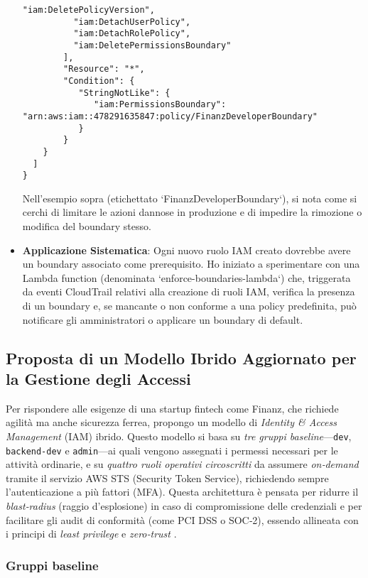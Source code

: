 \begin{itemize}
\begin{lstlisting}[style=json, caption={Esempio di Permission Boundary restrittiva per sviluppatori}, label=lst:permission-boundary-dev]
          "iam:DeletePolicyVersion",
          "iam:DetachUserPolicy",
          "iam:DetachRolePolicy",
          "iam:DeletePermissionsBoundary" 
        ],
        "Resource": "*",
        "Condition": {
           "StringNotLike": {
              "iam:PermissionsBoundary": "arn:aws:iam::478291635847:policy/FinanzDeveloperBoundary" 
           }
        }
    }
  ]
}
    \end{lstlisting}
    Nell'esempio sopra (etichettato `FinanzDeveloperBoundary`), si nota come si cerchi di limitare le azioni dannose in produzione e di impedire la rimozione o modifica del boundary stesso.
    \item \textbf{Applicazione Sistematica}: Ogni nuovo ruolo IAM creato dovrebbe avere un boundary associato come prerequisito. Ho iniziato a sperimentare con una Lambda function (denominata `enforce-boundaries-lambda`) che, triggerata da eventi CloudTrail relativi alla creazione di ruoli IAM, verifica la presenza di un boundary e, se mancante o non conforme a una policy predefinita, può notificare gli amministratori o applicare un boundary di default.
\end{itemize}

\subsection{Proposta di un Modello Ibrido Aggiornato per la Gestione degli Accessi}
\label{subsec:modello_ibrido_aggiornato_iam}
Per rispondere alle esigenze di una startup fintech come Finanz, che richiede agilità ma anche sicurezza ferrea, propongo un modello di \emph{Identity \& Access Management} (IAM) ibrido. Questo modello si basa su \emph{tre gruppi baseline}—\texttt{dev}, \texttt{backend‑dev} e \texttt{admin}—ai quali vengono assegnati i permessi necessari per le attività ordinarie, e su \emph{quattro ruoli operativi circoscritti} da assumere \emph{on‑demand} tramite il servizio AWS STS (Security Token Service), richiedendo sempre l'autenticazione a più fattori (MFA).
Questa architettura è pensata per ridurre il \emph{blast‑radius} (raggio d'esplosione) in caso di compromissione delle credenziali e per facilitare gli audit di conformità (come PCI DSS o SOC‑2), essendo allineata con i principi di \emph{least privilege} e \emph{zero‑trust} \cite{NIST_ZTA,NIST_SP80063,PCI_DSS,DatadogLeastPrivilege}.

\subsubsection{Gruppi baseline}
\label{subsubsec:gruppi_base_iam}

